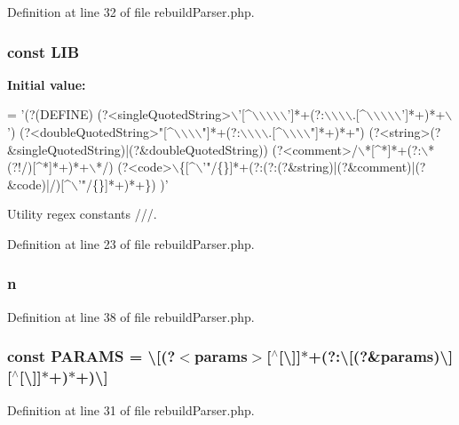 Definition at line 32 of file rebuild\+Parser.\+php.

\subsubsection[{L\+I\+B}]{\setlength{\rightskip}{0pt plus 5cm}const L\+I\+B}\label{rebuild_parser_8php_a514527ec3eba1a596624e43baa4c9373}
{\bfseries Initial value\+:}
\begin{DoxyCode}
= \textcolor{stringliteral}{'(?(DEFINE)}
\textcolor{stringliteral}{    (?<singleQuotedString>\(\backslash\)'[^\(\backslash\)\(\backslash\)\(\backslash\)\(\backslash\)\(\backslash\)']*+(?:\(\backslash\)\(\backslash\)\(\backslash\)\(\backslash\).[^\(\backslash\)\(\backslash\)\(\backslash\)\(\backslash\)\(\backslash\)']*+)*+\(\backslash\)')}
\textcolor{stringliteral}{    (?<doubleQuotedString>"[^\(\backslash\)\(\backslash\)\(\backslash\)\(\backslash\)"]*+(?:\(\backslash\)\(\backslash\)\(\backslash\)\(\backslash\).[^\(\backslash\)\(\backslash\)\(\backslash\)\(\backslash\)"]*+)*+")}
\textcolor{stringliteral}{    (?<string>(?&singleQuotedString)|(?&doubleQuotedString))}
\textcolor{stringliteral}{    (?<comment>/\(\backslash\)*[^*]*+(?:\(\backslash\)*(?!/)[^*]*+)*+\(\backslash\)*/)}
\textcolor{stringliteral}{    (?<code>\(\backslash\)\{[^\(\backslash\)'"/\{\}]*+(?:(?:(?&string)|(?&comment)|(?&code)|/)[^\(\backslash\)'"/\{\}]*+)*+\})}
\textcolor{stringliteral}{)'}
\end{DoxyCode}


Utility regex constants ///. 



Definition at line 23 of file rebuild\+Parser.\+php.

\subsubsection[{n}]{\setlength{\rightskip}{0pt plus 5cm}n}\label{rebuild_parser_8php_aeab71244afb687f16d8c4f5ee9d6ef0e}


Definition at line 38 of file rebuild\+Parser.\+php.

\subsubsection[{P\+A\+R\+A\+M\+S}]{\setlength{\rightskip}{0pt plus 5cm}const P\+A\+R\+A\+M\+S = \textquotesingle{}\textbackslash{}[(?$<$params$>$[$^\wedge$[\textbackslash{}]]$\ast$+(?\+:\textbackslash{}[(?\&params)\textbackslash{}][$^\wedge$[\textbackslash{}]]$\ast$+)$\ast$+)\textbackslash{}]\textquotesingle{}}\label{rebuild_parser_8php_aacd3e6bbd2d882356c0e48999f57d83a}


Definition at line 31 of file rebuild\+Parser.\+php.

